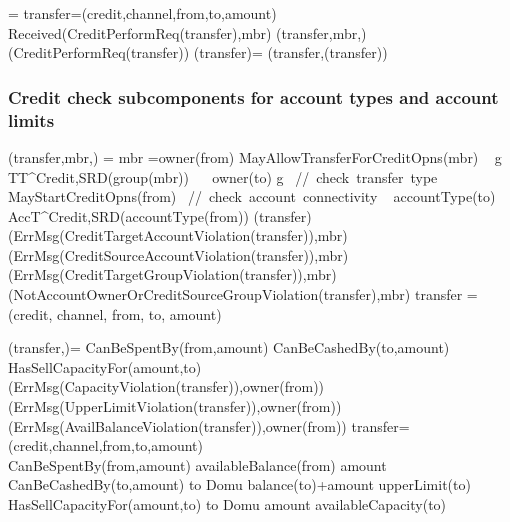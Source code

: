  
 \begin{asm}
  =\+
 \LET transfer=(credit,channel,from,to,amount)\\
 \IF Received(CreditPerformReq(transfer),\FROM mbr) \THEN \+  
 (transfer,mbr,)\\
 (CreditPerformReq(transfer))\dec\-
 \WHERE \+
 (transfer)=\+
 (transfer,(transfer))
 \end{asm}
 
 \subsubsection{Credit check subcomponents for account types and account limits} 
 
 \begin{asm}
 	(transfer,mbr,)  =\+
 	\IF mbr =owner(from) \AND MayAllowTransferForCreditOpns(mbr) \THEN \+
 	\IF ~ \FORSOME g \in TT^{Credit,SRD}(group(mbr)) 
 	~~ owner(to) \in g   \mbox{  // check transfer type} \THEN \+
 	\IF MayStartCreditOpns(from) 
 	\mbox{  // check account connectivity} \THEN \+
 	\IF ~ accountType(to) \in 
 	AccT^{Credit,SRD}(accountType(from)) \THEN \+
 	(transfer) \-
 	\ELSE ~ (ErrMsg(CreditTargetAccountViolation(transfer)),\TO mbr) \-
 	\ELSE ~ (ErrMsg(CreditSourceAccountViolation(transfer)),\TO mbr)\-
 	\ELSE ~ (ErrMsg(CreditTargetGroupViolation(transfer)),\TO mbr) \- 
 	\ELSE ~  (NotAccountOwnerOrCreditSourceGroupViolation(transfer),\TO mbr)\-
 	\WHERE \+
 	transfer = (credit, channel, from, to, amount)   
 \end{asm}
 
 \begin{asm}
 (transfer,)=\+
	\IF CanBeSpentBy(from,amount) \THEN \+
 		\IF CanBeCashedBy(to,amount) \THEN \+
			\IF HasSellCapacityFor(amount,to) \THEN \+
				 \-
			\ELSE ~ (ErrMsg(CapacityViolation(transfer)),\TO owner(from))\-
		\ELSE ~ (ErrMsg(UpperLimitViolation(transfer)),\TO owner(from))\-
	\ELSE ~ (ErrMsg(AvailBalanceViolation(transfer)),\TO owner(from))\-
 \WHERE \+
 transfer=(credit,channel,from,to,amount)\\
 CanBeSpentBy(from,amount) \IFF availableBalance(from) \geq amount \\
 CanBeCashedBy(to,amount) \IFF  
 to \not \in Domu \AND balance(to)+amount \leq upperLimit(to) \\
 HasSellCapacityFor(amount,to) \IFF  to \not \in Domu \AND   amount \leq availableCapacity(to)
 \end{asm}


